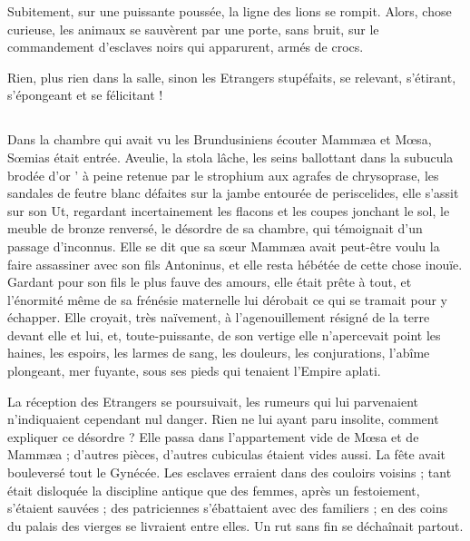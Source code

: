 \documentclass[a4paper, 11pt, oneside, polutonikogreek, french]{article}
\begin{document}
Subitement, sur une puissante poussée, la ligne des lions se rompit. Alors, chose curieuse, les animaux se sauvèrent par une porte, sans bruit, sur le commandement d'esclaves noirs qui apparurent, armés de crocs.

Rien, plus rien dans la salle, sinon les Etrangers stupéfaits, se relevant, s'étirant, s'épongeant et se félicitant !
\clearpage
\subsection{}
\paragraph{}
Dans la chambre qui avait vu les Brundusiniens écouter Mammæa et Mœsa, Sœmias était entrée. Aveulie, la stola lâche, les seins ballottant dans la subucula brodée d'or ' à peine retenue par le strophium aux agrafes de chrysoprase, les sandales de feutre blanc défaites sur la jambe entourée de periscelides, elle s'assit sur son Ut, regardant incertainement les flacons et les coupes jonchant le sol, le meuble de bronze renversé, le désordre de sa chambre, qui témoignait d'un passage d'inconnus. Elle se dit que sa sœur Mammæa avait peut-être voulu la faire assassiner avec son fils Antoninus, et elle resta hébétée de cette chose inouïe. Gardant pour son fils le plus fauve des amours, elle était prête à tout, et l'énormité même de sa frénésie maternelle lui dérobait ce qui se tramait pour y échapper. Elle croyait, très naïvement, à l'agenouillement résigné de la terre devant elle et lui, et, toute-puissante, de son vertige elle n'apercevait point les haines, les espoirs, les larmes de sang, les douleurs, les conjurations, l'abîme plongeant, mer fuyante, sous ses pieds qui tenaient l'Empire aplati.

La réception des Etrangers se poursuivait, les rumeurs qui lui parvenaient n'indiquaient cependant nul danger. Rien ne lui ayant paru insolite, comment expliquer ce désordre ? Elle passa dans l'appartement vide de Mœsa et de Mammæa ; d'autres pièces, d'autres cubiculas étaient vides aussi. La fête avait bouleversé tout le Gynécée. Les esclaves erraient dans des couloirs voisins ; tant était disloquée la discipline antique que des femmes, après un festoiement, s'étaient sauvées ; des patriciennes s'ébattaient avec des familiers ; en des coins du palais des vierges se livraient entre elles. Un rut sans fin se déchaînait partout.
\end{document}
